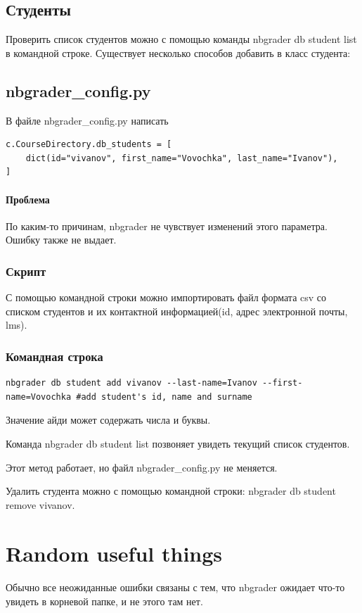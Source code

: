 \documentclass[a4paper,12pt]{article}
\begin{document}
\subsection{Студенты}

Проверить список студентов можно с помощью команды  nbgrader db student list в командной строке.
Существует несколько способов добавить в класс студента:
\subsection{nbgrader\_config.py}

В файле nbgrader\_config.py написать
\begin{verbatim}
c.CourseDirectory.db_students = [
    dict(id="vivanov", first_name="Vovochka", last_name="Ivanov"),
]
\end{verbatim}
\paragraph{Проблема}По каким-то причинам, nbgrader не чувствует изменений этого параметра. Ошибку также не выдает.
\subsubsection{Скрипт}

С помощью командной строки можно импортировать файл формата csv со списком студентов и их контактной информацией(id, адрес электронной почты, lms).
\subsubsection{Командная строка}

\begin{verbatim} 
nbgrader db student add vivanov --last-name=Ivanov --first-name=Vovochka #add student's id, name and surname
\end{verbatim}
Значение айди может содержать числа и буквы.

Команда nbgrader db student list позвоняет увидеть текущий список студентов.

Этот метод работает, но файл nbgrader\_config.py не меняется.

Удалить студента можно с помощью командной строки: nbgrader db student remove vivanov.
\section{Random useful things}

\paragraph{}
Обычно все неожиданные ошибки связаны с тем, что nbgrader ожидает что-то увидеть в корневой папке, и не этого там нет.
\end{document}
